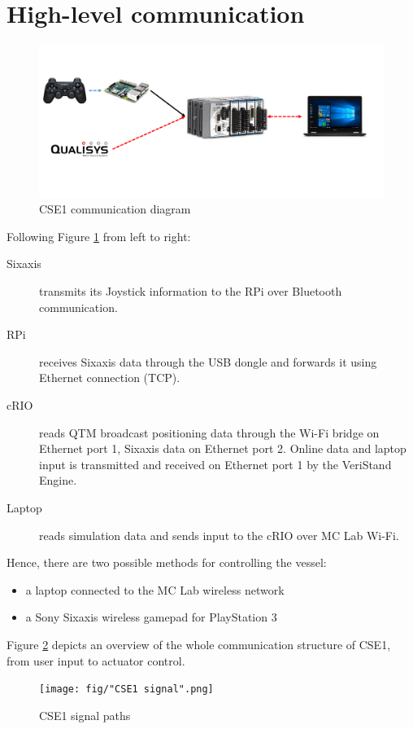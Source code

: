 \section{High-level communication}\label{sec:high_level_communication}
\begin{figure}[htb!]
	\centering
	\includegraphics[width=\textwidth]{fig/high-level_control.pdf}
	\caption{CSE1 communication diagram}
	\label{fig: CSE1 communication}
\end{figure}
Following Figure \ref{fig: CSE1 communication} from left to right:
\begin{description}
	\item [{Sixaxis}] transmits its Joystick information to the RPi over Bluetooth communication. 
	\item [{RPi}] receives Sixaxis data through the USB dongle and forwards it using Ethernet connection (TCP).
	\item [{cRIO}] reads QTM broadcast positioning data through the Wi-Fi bridge on Ethernet port 1, Sixaxis data on Ethernet port 2. Online data and laptop input is transmitted and received on Ethernet port 1 by the VeriStand Engine.
	\item [{Laptop}] reads simulation data and sends input to the cRIO over MC Lab Wi-Fi.
\end{description}
Hence, there are two possible methods for controlling the vessel:
\begin{itemize}
	\item a laptop connected to the MC Lab wireless network
	\item a Sony Sixaxis wireless gamepad for PlayStation 3
\end{itemize}
Figure \ref{fig: CSE1 signal} depicts an overview of the whole communication structure of CSE1, from user input to actuator control. 
\begin{figure}[htb!]
	\centering
	\texttt{[image: fig/"CSE1 signal".png]}
	\caption{CSE1 signal paths}
	\label{fig: CSE1 signal}
\end{figure}

